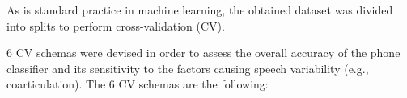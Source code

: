As is standard practice in machine learning, the obtained dataset was divided into
splits to perform cross-validation (CV). 

$6$ CV schemas were devised in order to assess the overall accuracy of the phone classifier and its
sensitivity to the factors causing speech variability (e.g., coarticulation). The $6$ CV schemas
are the following:

